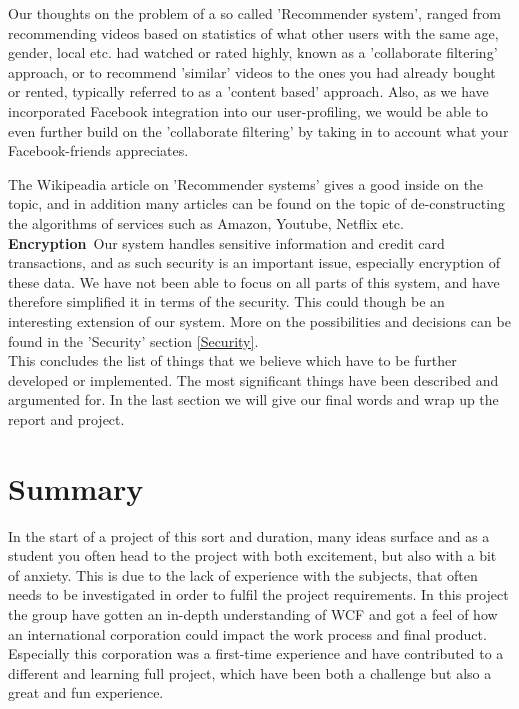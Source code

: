 Our thoughts on the problem of a so called 'Recommender system', ranged from recommending videos based on statistics of what other users with the same age, gender, local etc. had watched or rated highly, known as a 'collaborate filtering' approach, or to recommend 'similar' videos to the ones you had already bought or rented, typically referred to as a 'content based' approach. Also, as we have incorporated Facebook integration into our user-profiling, we would be able to even further build on the 'collaborate filtering' by taking in to account what your Facebook-friends appreciates. \

The Wikipeadia article on 'Recommender systems'\cite{RS} gives a good inside on the topic, and in addition many articles can be found on the topic of de-constructing the algorithms of services such as Amazon, Youtube, Netflix etc. \\

\textbf{Encryption}\
Our system handles sensitive information and credit card transactions, and as such security is an important issue, especially encryption of these data. We have not been able to focus on all parts of this system, and have therefore simplified it in terms of the security. This could though be an interesting extension of our system. More on the possibilities and decisions can be found in the 'Security' section \ref{Security}. \\

This concludes the list of things that we believe which have to be further developed or implemented. The most significant things have been described and argumented for. In the last section we will give our final words and wrap up the report and project.

\newpage
\section{Summary}
In the start of a project of this sort and duration, many ideas surface and as a student you often head to the project with both excitement, but also with a bit of anxiety. This is due to the lack of experience with the subjects, that often needs to be investigated in order to fulfil the project requirements. In this project the group have gotten an in-depth understanding of WCF and got a feel of how an international corporation could impact the work process and final product. Especially this corporation was a first-time experience and have contributed to a different and learning full project, which have been both a challenge but also a great and fun experience. 

